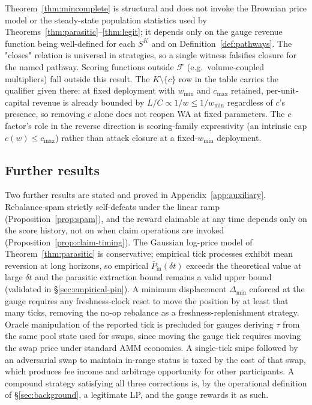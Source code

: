 \documentclass[11pt,a4paper]{article}
\theoremstyle{definition}
\theoremstyle{plain}
\theoremstyle{remark}
\begin{document}
Theorem~\ref{thm:mincomplete} is structural and does not invoke the Brownian price model or the steady-state population statistics used by Theorems~\ref{thm:parasitic}--\ref{thm:legit}; it depends only on the gauge revenue function being well-defined for each $S^K$ and on Definition~\ref{def:pathways}. The "closes" relation is universal in strategies, so a single witness falsifies closure for the named pathway. Scoring functions outside $\mathcal{F}$ (e.g.\ volume-coupled multipliers) fall outside this result. The $K \setminus \{c\}$ row in the table carries the qualifier given there: at fixed deployment with $w_{\min}$ and $c_{\max}$ retained, per-unit-capital revenue is already bounded by $L/C \propto 1/w \leq 1/w_{\min}$ regardless of $c$'s presence, so removing $c$ alone does not reopen WA at fixed parameters. The $c$ factor's role in the reverse direction is scoring-family expressivity (an intrinsic cap $c(w) \leq c_{\max}$) rather than attack closure at a fixed-$w_{\min}$ deployment.

\subsection{Further results}\label{sec:auxiliary}

Two further results are stated and proved in Appendix~\ref{app:auxiliary}. Rebalance-spam strictly self-defeats under the linear ramp (Proposition~\ref{prop:spam}), and the reward claimable at any time depends only on the score history, not on when claim operations are invoked (Proposition~\ref{prop:claim-timing}). The Gaussian log-price model of Theorem~\ref{thm:parasitic} is conservative; empirical tick processes exhibit mean reversion at long horizons, so empirical $\bar P_{\text{in}}(\delta t)$ exceeds the theoretical value at large $\delta t$ and the parasitic extraction bound remains a valid upper bound (validated in \S\ref{sec:empirical-pin}). A minimum displacement $\Delta_{\min}$ enforced at the gauge requires any freshness-clock reset to move the position by at least that many ticks, removing the no-op rebalance as a freshness-replenishment strategy. Oracle manipulation of the reported tick is precluded for gauges deriving $\tau$ from the same pool state used for swaps, since moving the gauge tick requires moving the swap price under standard AMM economics. A single-tick snipe followed by an adversarial swap to maintain in-range status is taxed by the cost of that swap, which produces fee income and arbitrage opportunity for other participants. A compound strategy satisfying all three corrections is, by the operational definition of \S\ref{sec:background}, a legitimate LP, and the gauge rewards it as such.
\end{document}
